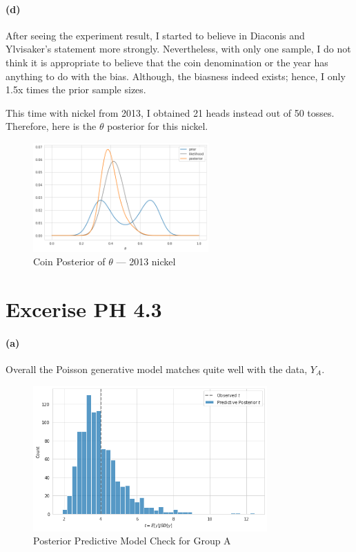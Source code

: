 \documentclass[11pt, letterpaper]{article}
\begin{document}
\paragraph{(d)}
After seeing the experiment result, I started to believe in Diaconis and Ylvisaker's statement more strongly.
Nevertheless, with only one sample, I do not think it is appropriate to believe that the coin denomination or the
year has anything to do with the bias. Although, the biasness indeed exists; hence, I only 1.5x times
the prior sample sizes.

\vspace{0.15in}

This time with nickel from 2013, I obtained 21 heads instead out of 50 tosses. Therefore, here is the
$\theta$ posterior for this nickel.

\begin{figure}[!h]
  \centering
  \includegraphics[width=0.6\textwidth]{3.8.d.png}
  \captionsetup{justification=centering}
  \caption{Coin Posterior of $\theta$ --- 2013 nickel}
\end{figure}

\newpage


\section{Excerise PH 4.3}
\paragraph{(a)}
Overall the Poisson generative model matches quite well with the data, $Y_A$. 

\begin{figure}[!h]
  \centering
  \includegraphics[width=0.8\textwidth]{4.3.a.png}
  \captionsetup{justification=centering}
  \caption{Posterior Predictive Model Check for Group A}
\end{figure}
\end{document}
